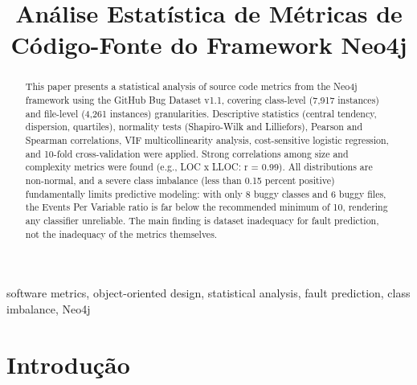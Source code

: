 \documentclass[conference]{IEEEtran}
\begin{document}
\title{Análise Estatística de Métricas de Código-Fonte do Framework Neo4j}

\author{
\and
{}
}

\maketitle

\begin{abstract}
This paper presents a statistical analysis of source code metrics from the Neo4j
framework using the GitHub Bug Dataset v1.1, covering class-level (7,917 instances)
and file-level (4,261 instances) granularities. Descriptive statistics (central
tendency, dispersion, quartiles), normality tests (Shapiro-Wilk and Lilliefors),
Pearson and Spearman correlations, VIF multicollinearity analysis, cost-sensitive
logistic regression, and 10-fold cross-validation were applied. Strong correlations
among size and complexity metrics were found (e.g., LOC x LLOC: r = 0.99).
All distributions are non-normal, and a severe class imbalance (less than 0.15 percent positive)
fundamentally limits predictive modeling: with only 8 buggy classes and 6 buggy
files, the Events Per Variable ratio is far below the recommended minimum of 10,
rendering any classifier unreliable. The main finding is dataset inadequacy for
fault prediction, not the inadequacy of the metrics themselves.
\end{abstract}

\begin{IEEEkeywords}
software metrics, object-oriented design, statistical analysis, fault prediction, class imbalance, Neo4j
\end{IEEEkeywords}

\section{Introdução}\label{sec:intro}
\end{document}

